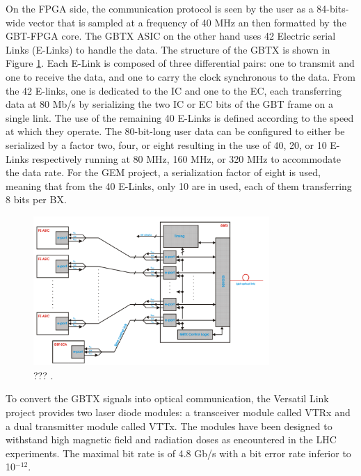       On the FPGA side, the communication protocol is seen by the user as a 84-bits-wide vector that is sampled at a frequency of 40 MHz an then formatted by the GBT-FPGA core. The GBTX ASIC on the other hand uses 42 Electric serial Links (E-Links) to handle the data. The structure of the GBTX is shown in Figure \ref{fig:II-2-gbt-asic}. Each E-Link is composed of three differential pairs: one to transmit and one to receive the data, and one to carry the clock synchronous to the data. From the 42 E-links, one is dedicated to the IC and one to the EC, each transferring data at 80 Mb/s by serializing the two IC or EC bits of the GBT frame on a single link. The use of the remaining 40 E-Links is defined according to the speed at which they operate. The 80-bit-long user data can be configured to either be serialized by a factor two, four, or eight resulting in the use of 40, 20, or 10 E-Links respectively running at 80 MHz, 160 MHz, or 320 MHz to accommodate the data rate. For the GEM project, a serialization factor of eight is used, meaning that from the 40 E-Links, only 10 are in used, each of them transferring 8 bits per BX. \\

      \begin{figure}[h!]
        \centering
        \includegraphics[width=0.8\textwidth]{img/II-2-daq/gbt-asic.png}
        \caption{??? \cite{Moreira:1235836}.}
        \label{fig:II-2-gbt-asic}
      \end{figure}

      To convert the GBTX signals into optical communication, the Versatil Link project provides two laser diode modules: a transceiver module called VTRx and a dual transmitter module called VTTx. The modules have been designed to withstand high magnetic field and radiation doses as encountered in the LHC experiments. The maximal bit rate is of 4.8 Gb/s with a bit error rate inferior to 10$^{-12}$.

